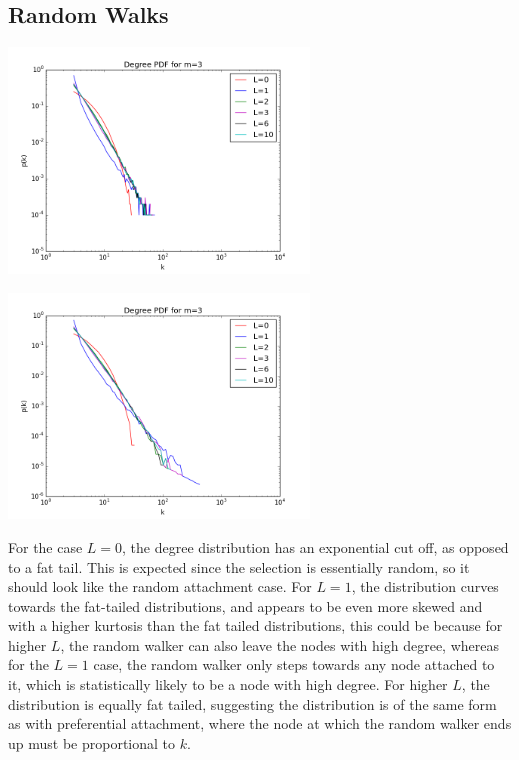 \documentclass[twoside]{article}
\begin{document}
\subsection{Random Walks}
\begin{multicols}{2}
\begin{center}
  \includegraphics[height=60mm]{degree_dist_RW_unbinned.png}
\end{center}
\begin{center}
  \includegraphics[height=60mm]{degree_dist_RW.png}
\end{center}
\end{multicols}
For the case $L=0$, the degree distribution has an exponential cut off, as opposed to a fat tail. This is expected since the selection is essentially random, so it should look like the random attachment case. For $L=1$, the distribution curves towards the fat-tailed distributions, and appears to be even more skewed and with a higher kurtosis than the fat tailed distributions, this could be because for higher $L$, the random walker can also leave the nodes with high degree, whereas for the $L=1$ case, the random walker only steps towards any node attached to it, which is statistically likely to be a node with high degree. For higher $L$, the distribution is equally fat tailed, suggesting the distribution is of the same form as with preferential attachment, where the node at which the random walker ends up must be proportional to $k$. 
\end{document}

